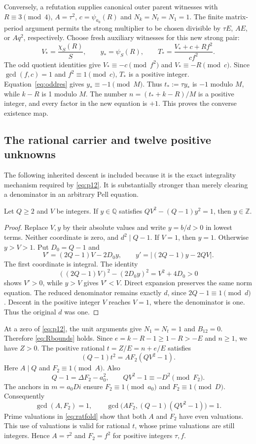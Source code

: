Conversely, a refutation supplies canonical outer parent witnesses with
$R\equiv3\pmod4$, $A=\tau^2$, $c=\psi_{a_0}(R)$ and $N_k=N_t=N_1=1$.
The finite matrix-period argument permits the strong multiplier to be
chosen divisible by $\tau E$, $AE$, or $Aq^2$, respectively. Choose
fresh auxiliary witnesses for this new strong pair:
\[
 V_*=\frac{\chi_S(R)}{S},\qquad y_*=\psi_S(R),\qquad
 T_*=\frac{V_*+c+Rf^2}{cf^2}.
\]
The odd quotient identities give $V_*\equiv-c\pmod{f^2}$ and
$V_*\equiv-R\pmod c$. Since $\gcd(f,c)=1$ and $f^2\equiv1\pmod c$,
$T_*$ is a positive integer.
Equation~\eqref{eq:oddres} gives $y_*\equiv-1\pmod M$.
Thus $t_*:=\tau y_*$ is $-1$ modulo $M$, while $k-R$ is 1 modulo $M$.
The number $n=(t_*+k-R)/M$ is a positive integer, and every factor
in the new equation is $+1$. This proves the converse existence map.

\subsection{The rational carrier and twelve positive unknowns}

The following inherited descent is included because it is the exact
integrality mechanism required by \eqref{eq:p12}. It is substantially
stronger than merely clearing a denominator in an arbitrary Pell equation.

\begin{lemma}\label{lem:integral}
Let $Q\ge2$ and $V$ be integers. If $y\in\mathbb Q$ satisfies
$QV^2-(Q-1)y^2=1$, then $y\in\mathbb Z$.
\end{lemma}
\begin{proof}
Replace $V,y$ by their absolute values and write $y=b/d>0$ in lowest
terms. Neither coordinate is zero, and $d^2\mid Q-1$. If $V=1$, then
$y=1$. Otherwise $y>V>1$. Put $D_0=Q-1$ and
\[
 V'=(2Q-1)V-2D_0y,\qquad
 y'=\bigl|(2Q-1)y-2QV\bigr|.
\]
The first coordinate is integral. The identity
\[
 ((2Q-1)V)^2-(2D_0y)^2=V^2+4D_0>0
\]
shows $V'>0$, while $y>V$ gives $V'<V$.
Direct expansion preserves the same norm equation. The reduced
denominator remains exactly $d$, since $2Q-1\equiv1\pmod d$.
Descent in the positive integer $V$ reaches $V=1$, where the denominator
is one. Thus the original $d$ was one.
\end{proof}

At a zero of \eqref{eq:p12}, the unit arguments give $N_1=N_t=1$
and $B_{12}=0$. Therefore \eqref{eq:Rbounds} holds. Since
$e=k-R-1\ge1-R>-E$ and $n\ge1$, we have $Z>0$.
The positive rational $t=Z/E=n+e/E$ satisfies
\begin{equation}\label{eq:ratfold}
 (Q-1)t^2=AF_2(QV^2-1).
\end{equation}
Here $A\mid Q$ and $F_2\equiv1\pmod A$. Also
\[
 Q-1=\Delta F_2-a_0^2,
 \qquad QV^2-1\equiv-D^2\pmod{F_2}.
\]
The anchors in $m=a_0Di$ ensure $F_2\equiv1\pmod{a_0}$ and
$F_2\equiv1\pmod D$. Consequently
\[
 \gcd(A,F_2)=1,\qquad
 \gcd\bigl(AF_2,(Q-1)(QV^2-1)\bigr)=1.
\]
Prime valuations in \eqref{eq:ratfold} show that both $A$ and $F_2$
have even valuations. This use of valuations is valid for rational
$t$, whose prime valuations are still integers. Hence
$A=\tau^2$ and $F_2=f^2$ for positive integers $\tau,f$.

